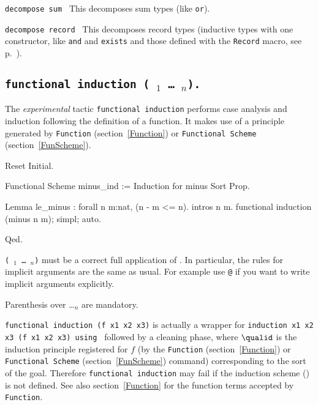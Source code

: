 \begin{Variants}
  
\item {\tt decompose sum \term}
  This decomposes sum types (like \texttt{or}).
\item {\tt decompose record \term}
  This decomposes record types (inductive types with one constructor,
  like \texttt{and} and \texttt{exists} and those defined with the
  \texttt{Record} macro, see p.~\pageref{Record}).
\end{Variants}


\subsection{\tt functional induction (\qualid\ \term$_1$ \dots\ \term$_n$).
\label{FunInduction}}

The \emph{experimental} tactic \texttt{functional induction} performs
case analysis and induction following the definition of a function. It
makes use of a principle generated by \texttt{Function}
(section~\ref{Function}) or \texttt{Functional Scheme}
(section~\ref{FunScheme}).

\begin{coq_eval}
Reset Initial.
\end{coq_eval}
\begin{coq_example}
Functional Scheme minus_ind := Induction for minus Sort Prop.

Lemma le_minus : forall n m:nat, (n - m <= n).
intros n m.
functional induction (minus n m); simpl; auto.
\end{coq_example}
\begin{coq_example*}
Qed.
\end{coq_example*}

\Rem \texttt{(\qualid\ \term$_1$ \dots\ \term$_n$)} must be a correct
full application of \qualid. In particular, the rules for implicit
arguments are the same as usual. For example use \texttt{@\qualid} if
you want to write implicit arguments explicitly.

\Rem Parenthesis over \qualid \dots \term$_n$ are mandatory.

\Rem \texttt{functional induction (f x1 x2 x3)} is actually a wrapper
for \texttt{induction x1 x2 x3 (f x1 x2 x3) using \qualid} followed by
a cleaning phase, where $\qualid$ is the induction principle
registered for $f$ (by the \texttt{Function} (section~\ref{Function})
or \texttt{Functional Scheme} (section~\ref{FunScheme}) command)
corresponding to the sort of the goal.  Therefore \texttt{functional
  induction} may fail if the induction scheme (\texttt{\qualid}) is
not defined. See also section~\ref{Function} for the function terms
accepted by \texttt{Function}.

